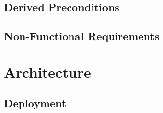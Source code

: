 \subsection{Derived Preconditions}

\subsection{Non-Functional Requirements}

	
	

\pagebreak

\section{Architecture}

\subsection{Deployment}
